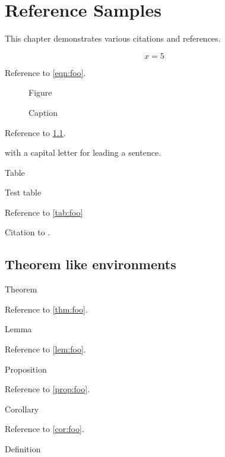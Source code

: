 \chapter{Reference Samples}

This chapter demonstrates various citations and references.

\begin{equation}\label{eqn:foo}
  x = 5
\end{equation}

Reference to \cref{eqn:foo}.

\begin{figure}[h!]
  \centering
  Figure
  \caption{Caption}
  \label{fig:foo}
\end{figure}

Reference to \cref{fig:foo}.

 with a capital letter for leading a sentence.

\begin{table}[h!]
  \centering
  Table
  \caption{Test table}
  \label{tab:foo}
\end{table}

Reference to \cref{tab:foo}

Citation to \cite{Nobody06}.

\section{Theorem like environments}

\begin{thm}\label{thm:foo}
  Theorem
\end{thm}

Reference to \cref{thm:foo}.

\begin{lem}\label{lem:foo}
  Lemma
\end{lem}

Reference to \cref{lem:foo}.

\begin{prop}\label{prop:foo}
  Proposition
\end{prop}

Reference to \cref{prop:foo}.

\begin{cor}\label{cor:foo}
  Corollary
\end{cor}

Reference to \cref{cor:foo}.

\begin{defn}\label{defn:foo}
  Definition
\end{defn}

